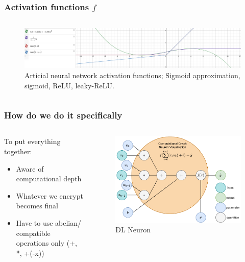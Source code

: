\documentclass[aspectratio=169]{beamer}
\begin{document}
  \begin{frame}
    \frametitle{Activation functions $f$}
    \begin{columns}
      \begin{column}{1\textwidth}
        \begin{figure}[th!]
          \centering
          \includegraphics[width=1\textwidth]{activations.png}
          \caption{Articial neural network activation functions; Sigmoid approximation, sigmoid, ReLU, leaky-ReLU. \autocite{repository}}
          \label{fig:approximation}
        \end{figure}
      \end{column}
    \end{columns}
  \end{frame}

  \begin{frame}
    \frametitle{How do we do it specifically}
    \begin{columns}
      \begin{column}{0.5\textwidth}
        To put everything together:
        \begin{itemize}
          \item Aware of computational depth
          \item Whatever we encrypt becomes final
          \item Have to use abelian/ compatible operations only (+, *, +(-x))
        \end{itemize}
      \end{column}
      \begin{column}{0.5\textwidth}
        \begin{figure}[th!]
          \centering
          \includegraphics[width=1\textwidth]{neuron_computational_graph.pdf}
          \caption{DL Neuron \autocite{openmined}}
        \end{figure}
      \end{column}
    \end{columns}
  \end{frame}
\end{document}

